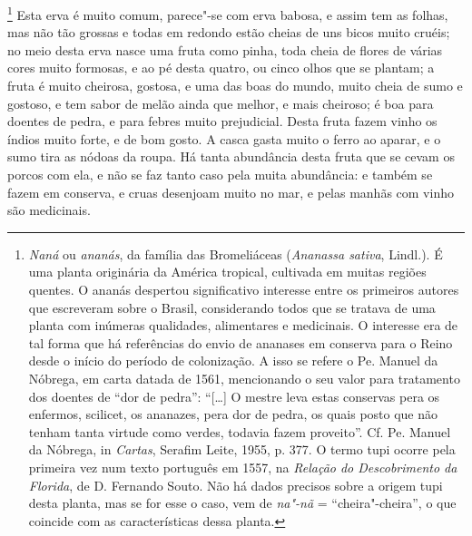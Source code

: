 \begin{linenumbers}
\footnote{ \textit{Naná} ou \textit{ananás}, 
da família das Bromeliáceas (\textit{Ananassa sativa}, Lindl.). É uma
planta originária da América tropical, cultivada em muitas regiões
quentes. O ananás despertou significativo interesse entre os primeiros
autores que escreveram sobre o Brasil, considerando todos que se
tratava de uma planta com inúmeras qualidades, alimentares e
medicinais. O interesse era de tal forma que há referências do envio de
ananases em conserva para o Reino desde o início do período de
colonização. A isso se refere o Pe. Manuel da Nóbrega, em carta datada
de 1561, mencionando o seu valor para tratamento dos doentes de ``dor
de pedra'': ``[\ldots{}] O mestre leva estas conservas pera os enfermos,
scilicet, os ananazes, pera dor de pedra, os quais posto que não tenham
tanta virtude como verdes, todavia fazem proveito''. Cf. Pe. Manuel da
Nóbrega, in \textit{Cartas}, Serafim Leite, 1955, p. 377. O termo tupi
ocorre pela primeira vez num texto português em 1557, na
\textit{Relação do Descobrimento da Florida}, de D. Fernando Souto. Não
há dados precisos sobre a origem tupi desta planta, mas se for esse o
caso, vem de \textit{na"-nã} = ``cheira"-cheira'', o que coincide com as
características dessa planta.} Esta erva é muito comum,
parece"-se com erva babosa, e assim tem as folhas, mas não tão grossas e
todas em redondo estão cheias de uns bicos muito cruéis; no meio desta
erva nasce uma fruta como pinha, toda cheia de flores de várias cores
muito formosas, e ao pé desta quatro, ou cinco olhos que se plantam; a
fruta é muito cheirosa, gostosa, e uma das boas do mundo, muito cheia
de sumo e gostoso, e tem sabor de melão ainda que melhor, e mais
cheiroso; é boa para doentes de pedra, e para febres muito prejudicial.
Desta fruta fazem vinho os índios muito forte, e de bom gosto. A casca
gasta muito o ferro ao aparar, e o sumo tira as nódoas da roupa. Há
tanta abundância desta fruta que se cevam os porcos com ela, e não se
faz tanto caso pela muita abundância: e também se fazem em conserva, e
cruas desenjoam muito no mar, e pelas manhãs com vinho são \mbox{medicinais.} 


\end{linenumbers}
